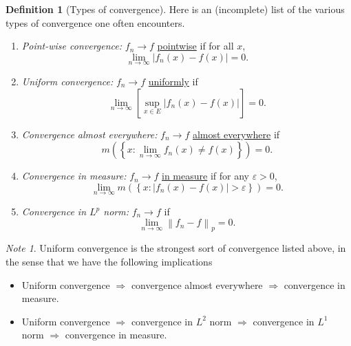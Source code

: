 \documentclass[a4paper,12pt]{scrreprt}
\newcommand{\defn}[1]{\ul{#1}}
\newcommand{\norm}[1]{\left\|#1\right\|}
\theoremstyle{definition}
\newtheorem{definition}{Definition}[section]
\theoremstyle{plain}
\theoremstyle{remark}
\newtheorem{note}{Note}[section]
\begin{document}
\begin{definition}[Types of convergence]
  \label{def:typesofconvergence}
  Here is an (incomplete) list of the various types of convergence one often encounters.
  \begin{enumerate}
    \item \emph{Point-wise convergence:} $f_{n} \to f$ \defn{pointwise} if for all $x$,
      \begin{equation*}
        \lim_{n \to \infty} \left|f_{n}(x) - f(x) \right| = 0.
      \end{equation*}

    \item \emph{Uniform convergence:} $f_{n} \to f$ \defn{uniformly} if
      \begin{equation*}
        \lim_{n \to \infty} \left[ \sup_{x \in E} \left| f_{n}(x) - f(x) \right| \right] = 0.
      \end{equation*}

    \item \emph{Convergence almost everywhere:} $f_{n} \to f$ \defn{almost everywhere} if
      \begin{equation*}
        m\left( \left\{ x\colon \lim_{n \to \infty} f_{n}(x) \neq f(x)  \right\} \right) = 0.
      \end{equation*}

    \item \emph{Convergence in measure:} $f_{n} \to f$ \defn{in measure} if for any $\varepsilon > 0$,
      \begin{equation*}
        \lim_{n \to \infty} m\left( \left\{ x\colon \left|f_{n}(x) - f(x) \right| > \varepsilon \right\} \right) = 0.
      \end{equation*}

    \item \emph{Convergence in $L^{p}$ norm:} $f_{n} \to f$ if
      \begin{equation*}
        \lim_{n \to \infty} \norm{f_{n} - f}_{p} = 0.
      \end{equation*}
  \end{enumerate}
\end{definition}

\begin{note}
  Uniform convergence is the strongest sort of convergence listed above, in the sense that we have the following implications
  \begin{itemize}
    \item Uniform convergence $\Rightarrow$ convergence almost everywhere $\Rightarrow$ convergence in measure.

    \item Uniform convergence $\Rightarrow$ convergence in $L^{2}$ norm $\Rightarrow$ convergence in $L^{1}$ norm $\Rightarrow$ convergence in measure.
  \end{itemize}
\end{note}
\end{document}
